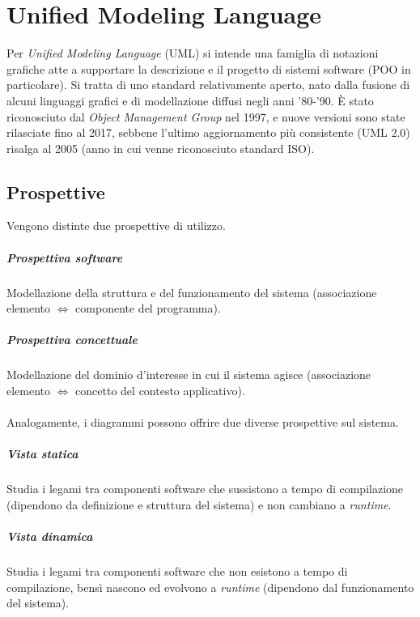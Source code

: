 \chapter{Unified Modeling Language}

Per \textit{Unified Modeling Language} (UML) si intende una famiglia di notazioni grafiche atte a supportare la descrizione e il progetto di sistemi software (POO in particolare). Si tratta di uno standard relativamente aperto, nato dalla fusione di alcuni linguaggi grafici e di modellazione diffusi negli anni '80-'90. È stato riconosciuto dal \textit{Object Management Group} nel 1997, e nuove versioni sono state rilasciate fino al 2017, sebbene l'ultimo aggiornamento più consistente (UML 2.0) risalga al 2005 (anno in cui venne riconosciuto standard ISO).

\section{Prospettive}

Vengono distinte due prospettive di utilizzo.

\paragraph{Prospettiva software} Modellazione della struttura e del funzionamento del sistema (associazione elemento $\Leftrightarrow$ componente del programma).

\paragraph{Prospettiva concettuale} Modellazione del dominio d'interesse in cui il sistema agisce (associazione elemento $\Leftrightarrow$ concetto del contesto applicativo).
\\
\\
Analogamente, i diagrammi possono offrire due diverse prospettive sul sistema.

\paragraph{Vista statica} Studia i legami tra componenti software che sussistono a tempo di compilazione (dipendono da definizione e struttura del sistema) e non cambiano a \textit{runtime}.

\paragraph{Vista dinamica} Studia i legami tra componenti software che non esistono a tempo di compilazione, bensì nascono ed evolvono a \textit{runtime} (dipendono dal funzionamento del sistema).

